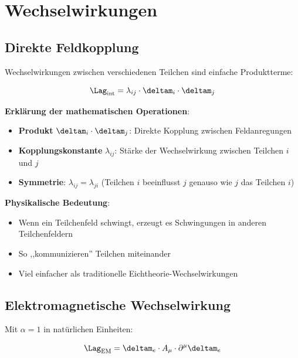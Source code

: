 	\section{Wechselwirkungen}
	
	\subsection{Direkte Feldkopplung}
	
	Wechselwirkungen zwischen verschiedenen Teilchen sind einfache Produktterme:
	
	\begin{equation}
		\Lag_{\text{int}} = \lambda_{ij} \cdot \deltam_i \cdot \deltam_j
		\label{eq:interaction_lagrangian}
	\end{equation}
	
	\textbf{Erklärung der mathematischen Operationen}:
	\begin{itemize}
		\item \textbf{Produkt} $\deltam_i \cdot \deltam_j$: Direkte Kopplung zwischen Feldanregungen
		\item \textbf{Kopplungskonstante} $\lambda_{ij}$: Stärke der Wechselwirkung zwischen Teilchen $i$ und $j$
		\item \textbf{Symmetrie}: $\lambda_{ij} = \lambda_{ji}$ (Teilchen $i$ beeinflusst $j$ genauso wie $j$ das Teilchen $i$)
	\end{itemize}
	
	\textbf{Physikalische Bedeutung}:
	\begin{itemize}
		\item Wenn ein Teilchenfeld schwingt, erzeugt es Schwingungen in anderen Teilchenfeldern
		\item So ,,kommunizieren'' Teilchen miteinander
		\item Viel einfacher als traditionelle Eichtheorie-Wechselwirkungen
	\end{itemize}
	
	\subsection{Elektromagnetische Wechselwirkung}
	
	Mit $\alpha = 1$ in natürlichen Einheiten:
	
	\begin{equation}
		\Lag_{\text{EM}} = \deltam_e \cdot A_\mu \cdot \partial^\mu \deltam_e
		\label{eq:em_interaction}
	\end{equation}
	
